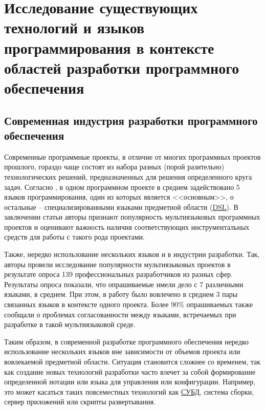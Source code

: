 \section{Исследование существующих технологий и языков программирования в контексте
областей разработки программного обеспечения}

\subsection{Современная индустрия разработки программного обеспечения}

Современные программные проекты, в отличие от многих программных проектов прошлого,
гораздо чаще состоят из набора разных (порой разительно) технологических
решений, предназначенных для решения определенного круга задач. Согласно \cite{empirical-analysis},
в одном программном проекте в среднем задействовано 5 языков программирования, один из
которых является <<основным>>, о остальные -- специализированными языками предметной области (\hyperlink{DSL}{DSL}).
В заключении статьи авторы признают популярность мультиязыковых программных проектов
и оценивают важность наличия соответствующих инструментальных средств для работы с
такого рода проектами.

Также, нередко использование нескольких языков и в индустрии разработки. Так, авторы \cite{professional-developers}
провели исследование популярности мультиязыковых проектов
в результате опроса 139 профессиональных разработчиков из разных сфер. 
Результаты опроса показали, что опрашиваемые имели дело с 7 различными языками, в среднем.
При этом, в работу было вовлечено в среднем 3 пары связанных языков в контексте одного проекта.
Более 90\% опрашиваемых также сообщали о проблемах согласованности между языками,
встречаемых при разработке в такой мультиязыковой среде. 

Таким образом, в современной разработке программного обеспечения нередко использование
нескольких языков вне зависимости от объемов проекта или вовлекаемой предметной области.
Ситуация становится сложнее со временем, так как создание новых технологий разработки
часто влечет за собой формирование определенной нотации или языка для управления или конфигурации.
Например, это может касаться таких повсеместных технологий как \hyperlink{СУБД}{СУБД}, система сборки,
сервер приложений или скрипты развертывания.

